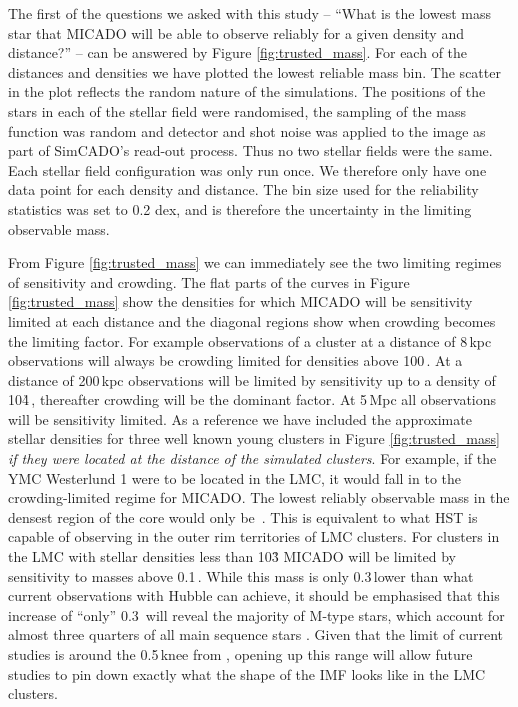 The first of the questions we asked with this study -- ``What is the lowest
mass star that MICADO will be able to observe reliably for a given density
and  distance?'' -- can be answered by Figure \ref{fig:trusted_mass}. For
each  of the distances and densities we have plotted the lowest reliable mass
bin. The scatter in the plot reflects the random nature of the simulations.
The  positions of the stars in each of the stellar field were randomised, the
sampling of the mass function was random and detector and shot noise was
applied to the image as part of SimCADO's read-out process. Thus no two
stellar  fields were the same. Each stellar field configuration was only run
once. We therefore only have one data point for each density and distance.
The  bin size used for the reliability statistics was set to 0.2 dex, and is
therefore the uncertainty in the limiting observable mass.

From Figure \ref{fig:trusted_mass} we can immediately see the two limiting
regimes of sensitivity and crowding. The flat parts of the curves in Figure
\ref{fig:trusted_mass} show the densities for which MICADO will be
sensitivity  limited at each distance and the diagonal regions show when
crowding becomes the limiting factor. For example observations of a cluster
at a distance of 8\,kpc observations will always be crowding limited for
densities above 100\,\spae. At a distance of 200\,kpc observations will be
limited by sensitivity up to a density of 10\h4\,\spa, thereafter crowding
will  be the dominant factor. At 5\,Mpc all observations will be sensitivity
limited. As a reference we have included the approximate stellar densities
for  three well known young clusters in Figure \ref{fig:trusted_mass}
\textit{if they were located at the distance of the simulated clusters}. For
example, if the YMC Westerlund 1 were to be located in the LMC, it would fall
in to the crowding-limited regime for MICADO. The lowest reliably observable
mass in the densest region of the core would only be \,\msun. This is
equivalent to what HST is capable of observing in the outer rim territories
of  LMC clusters. For clusters in the LMC with stellar densities less than
10\h3 MICADO will be limited by sensitivity to masses above 0.1\,\msun. While
this mass is only 0.3\,\msun lower than what current observations with Hubble
can achieve, it should be emphasised that this increase of ``only'' 0.3\,
\msun  will reveal the majority of M-type stars, which account for almost
three  quarters of all main sequence stars \citep{ledrew2001}. Given that the
limit of current studies is around the 0.5\,\msun knee from
\citet{kroupa2001},  opening up this range will allow future studies to pin
down exactly what the shape of the IMF looks like in the LMC clusters.

